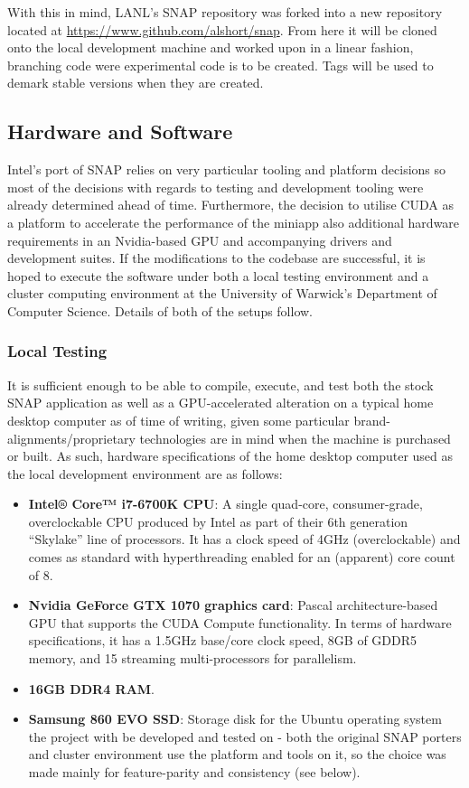 \documentclass[conference]{IEEEtran}
\begin{document}
With this in mind, LANL's SNAP repository was forked into a new repository located at \url{https://www.github.com/alshort/snap}. From here it will be cloned onto the local development machine and worked upon in a linear fashion, branching code were experimental code is to be created. Tags will be used to demark stable versions when they are created.

\subsection{Hardware and Software}

Intel's port of SNAP relies on very particular tooling and platform decisions so most of the decisions with regards to testing and development tooling were already determined ahead of time. Furthermore, the decision to utilise CUDA as a platform to accelerate the performance of the miniapp also additional hardware requirements in an Nvidia-based GPU and accompanying drivers and development suites. If the modifications to the codebase are successful, it is hoped to execute the software under both a local testing environment and a cluster computing environment at the University of Warwick's Department of Computer Science. Details of both of the setups follow.

\subsubsection{Local Testing}

It is sufficient enough to be able to compile, execute, and test both the stock SNAP application as well as a GPU-accelerated alteration on a typical home desktop computer as of time of writing, given some particular brand-alignments/proprietary technologies are in mind when the machine is purchased or built. As such, hardware specifications of the home desktop computer used as the local development environment are as follows:

\begin{itemize}
    \item \textbf{Intel® Core™ i7-6700K CPU}: A single quad-core, consumer-grade, overclockable CPU produced by Intel as part of their 6th generation ``Skylake'' line of processors. It has a clock speed of 4GHz (overclockable) and comes as standard with hyperthreading enabled for an (apparent) core count of 8.
    \item \textbf{Nvidia GeForce GTX 1070 graphics card}: Pascal architecture-based GPU that supports the CUDA Compute functionality. In terms of hardware specifications, it has a 1.5GHz base/core clock speed, 8GB of GDDR5 memory, and 15 streaming multi-processors for parallelism.
    \item \textbf{16GB DDR4 RAM}.
    \item \textbf{Samsung 860 EVO SSD}: Storage disk for the Ubuntu operating system the project with be developed and tested on - both the original SNAP porters and cluster environment use the platform and tools on it, so the choice was made mainly for feature-parity and consistency (see below).
\end{itemize}
\end{document}
